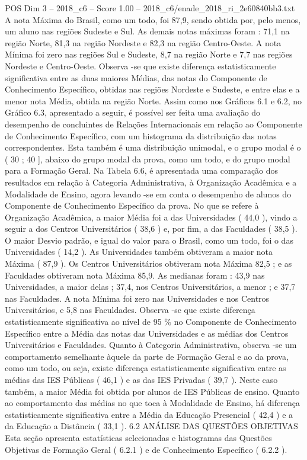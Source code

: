 \begin{textsample}{POS Dim 3 – 2018\_c6 – Score 1.00 – 2018\_c6/enade\_2018\_ri\_2e60840bb3.txt}
A nota Máxima do Brasil, como um todo, foi 87,9, sendo obtida por, pelo menos, um aluno nas regiões Sudeste e Sul.
As demais notas máximas foram : 71,1 na região Norte, 81,3 na região Nordeste e 82,3 na região Centro-Oeste.
A nota Mínima foi zero nas regiões Sul e Sudeste, 8,7 na região Norte e 7,7 nas regiões Nordeste e Centro-Oeste.
Observa -se que existe diferença estatisticamente significativa entre as duas maiores Médias, das notas do Componente de Conhecimento Específico, obtidas nas regiões Nordeste e Sudeste, e entre elas e a menor nota Média, obtida na região Norte.
Assim como nos Gráficos 6.1 e 6.2, no Gráfico 6.3, apresentado a seguir, é possível ser feita uma avaliação do desempenho de concluintes de Relações Internacionais em relação ao Componente de Conhecimento Específico, com um histograma da distribuição das notas correspondentes.
Esta também é uma distribuição unimodal, e o grupo modal é o ( 30 ; 40 ], abaixo do grupo modal da prova, como um todo, e do grupo modal para a Formação Geral.
Na Tabela 6.6, é apresentada uma comparação dos resultados em relação à Categoria Administrativa, à Organização Acadêmica e a Modalidade de Ensino, agora levando -se em conta o desempenho de alunos do Componente de Conhecimento Específico da prova.
No que se refere à Organização Acadêmica, a maior Média foi a das Universidades ( 44,0 ), vindo a seguir a dos Centros Universitários ( 38,6 ) e, por fim, a das Faculdades ( 38,5 ).
O maior Desvio padrão, e igual do valor para o Brasil, como um todo, foi o das Universidades ( 14,2 ).
As Universidades também obtiveram a maior nota Máxima ( 87,9 ).
Os Centros Universitários obtiveram nota Máxima 82,5 ; e as Faculdades obtiveram nota Máxima 85,9.
As medianas foram : 43,9 nas Universidades, a maior delas ; 37,4, nos Centros Universitários, a menor ; e 37,7 nas Faculdades.
A nota Mínima foi zero nas Universidades e nos Centros Universitários, e 5,8 nas Faculdades.
Observa -se que existe diferença estatisticamente significativa ao nível de 95 \% no Componente de Conhecimento Específico entre a Média das notas das Universidades e as médias dos Centros Universitários e Faculdades.
Quanto à Categoria Administrativa, observa -se um comportamento semelhante àquele da parte de Formação Geral e ao da prova, como um todo, ou seja, existe diferença estatisticamente significativa entre as médias das IES Públicas ( 46,1 ) e as das IES Privadas ( 39,7 ).
Neste caso também, a maior Média foi obtida por alunos de IES Públicas de ensino.
Quanto ao comportamento das médias no que toca à Modalidade de Ensino, há diferença estatisticamente significativa entre a Média da Educação Presencial ( 42,4 ) e a da Educação a Distância ( 33,1 ). 6.2 ANÁLISE DAS QUESTÕES OBJETIVAS Esta seção apresenta estatísticas selecionadas e histogramas das Questões Objetivas de Formação Geral ( 6.2.1 ) e de Conhecimento Específico ( 6.2.2 ).

\end{textsample}
